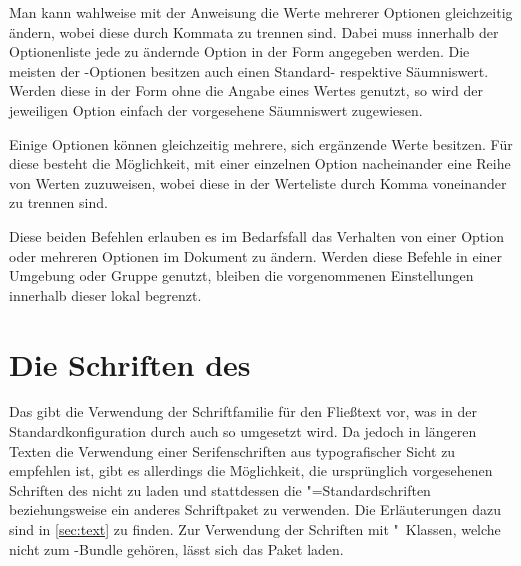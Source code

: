 \begin{DeclareEntity*}{}
\begin{DeclareEntity*}{}
\begin{DeclareEntity*}{}
\begin{Declaration}
\begin{Declaration}
Man kann wahlweise mit der Anweisung  die Werte mehrerer 
Optionen gleichzeitig ändern, wobei diese durch Kommata zu trennen sind. Dabei 
muss innerhalb der Optionenliste jede zu ändernde Option in der Form 
\PValue{=} angegeben werden. Die meisten der 
\TUDScript-Optionen besitzen auch einen Standard- respektive Säumniswert. 
Werden diese in der Form  ohne die Angabe eines Wertes genutzt, 
so wird der jeweiligen Option einfach der vorgesehene Säumniswert zugewiesen.

Einige Optionen können gleichzeitig mehrere, sich ergänzende Werte besitzen. 
Für diese besteht die Möglichkeit, mit  einer einzelnen Option 
nacheinander eine Reihe von Werten zuzuweisen, wobei diese in der Werteliste 
durch Komma voneinander zu trennen sind.

Diese beiden Befehlen erlauben es im Bedarfsfall das Verhalten von einer Option 
oder mehreren Optionen im Dokument zu ändern. Werden diese Befehle in einer 
Umgebung oder Gruppe genutzt, bleiben die vorgenommenen Einstellungen innerhalb 
dieser lokal begrenzt.
\end{Declaration}
\end{Declaration}



\section{%
  Die Schriften des \CDs%
  \label{sec:fonts}%
}

%
Das \TUDCD gibt die Verwendung der Schriftfamilie \OpenSans für den Fließtext 
vor, was in der Standardkonfiguration durch \TUDScript auch so umgesetzt wird. 
Da jedoch in längeren Texten die Verwendung einer Serifenschriften aus 
typografischer Sicht zu empfehlen ist, gibt es allerdings die Möglichkeit, die 
ursprünglich vorgesehenen Schriften des \CDs nicht zu laden und stattdessen die 
"=Standardschriften beziehungsweise ein anderes Schriftpaket zu 
verwenden. Die Erläuterungen dazu sind in \autoref{sec:text} zu finden. Zur 
Verwendung der Schriften mit "~Klassen, welche nicht zum 
\TUDScript-Bundle gehören, lässt sich das Paket  laden.


\end{DeclareEntity*}
\end{DeclareEntity*}
\end{DeclareEntity*}
